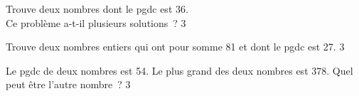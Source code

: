 \documentclass[a4paper,12pt]{report}
\begin{document}
\begin{exo}{
    Trouve deux nombres dont le pgdc est 36. \\ Ce problème a-t-il plusieurs solutions~?
}{3}\end{exo}






\begin{exo}{
    Trouve deux nombres entiers qui ont pour somme 81 et dont le pgdc est 27.
}{3}\end{exo}





\begin{exo}{
    Le pgdc de deux nombres est 54. Le plus grand des deux nombres est 378. Quel peut être l'autre nombre~?
}{3}\end{exo}













\end{document}
